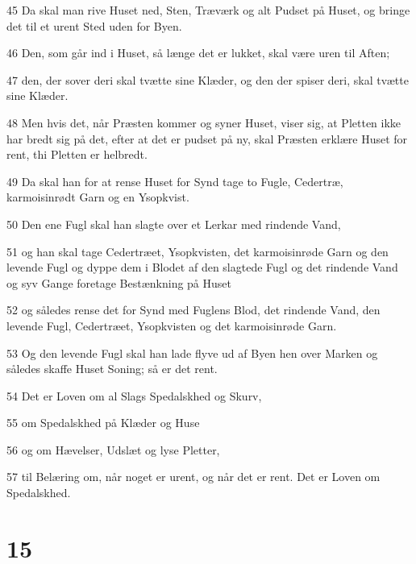 \par 45 Da skal man rive Huset ned, Sten, Træværk og alt Pudset på Huset, og bringe det til et urent Sted uden for Byen.
\par 46 Den, som går ind i Huset, så længe det er lukket, skal være uren til Aften;
\par 47 den, der sover deri skal tvætte sine Klæder, og den der spiser deri, skal tvætte sine Klæder.
\par 48 Men hvis det, når Præsten kommer og syner Huset, viser sig, at Pletten ikke har bredt sig på det, efter at det er pudset på ny, skal Præsten erklære Huset for rent, thi Pletten er helbredt.
\par 49 Da skal han for at rense Huset for Synd tage to Fugle, Cedertræ, karmoisinrødt Garn og en Ysopkvist.
\par 50 Den ene Fugl skal han slagte over et Lerkar med rindende Vand,
\par 51 og han skal tage Cedertræet, Ysopkvisten, det karmoisinrøde Garn og den levende Fugl og dyppe dem i Blodet af den slagtede Fugl og det rindende Vand og syv Gange foretage Bestænkning på Huset
\par 52 og således rense det for Synd med Fuglens Blod, det rindende Vand, den levende Fugl, Cedertræet, Ysopkvisten og det karmoisinrøde Garn.
\par 53 Og den levende Fugl skal han lade flyve ud af Byen hen over Marken og således skaffe Huset Soning; så er det rent.
\par 54 Det er Loven om al Slags Spedalskhed og Skurv,
\par 55 om Spedalskhed på Klæder og Huse
\par 56 og om Hævelser, Udslæt og lyse Pletter,
\par 57 til Belæring om, når noget er urent, og når det er rent. Det er Loven om Spedalskhed.

\chapter{15}

